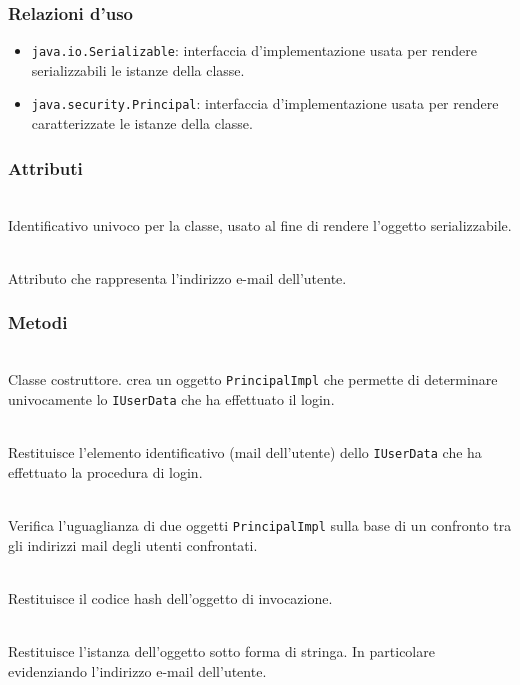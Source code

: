\subsubsection*{Relazioni d'uso}
\begin{itemize}
	\item \texttt{java.io.Serializable}: interfaccia d'implementazione usata per rendere serializzabili le istanze della classe.
	\item \texttt{java.security.Principal}: interfaccia d'implementazione usata per rendere caratterizzate le istanze della classe.
\end{itemize}

\subsubsection*{Attributi}
\begin{description}
  \item{}\\
  Identificativo univoco per la classe, usato al fine di rendere l'oggetto serializzabile.
  \item{}\\
  Attributo che rappresenta l'indirizzo e-mail dell'utente.
\end{description}

\subsubsection*{Metodi}
\begin{description}
	\item{}\\
	Classe costruttore. crea un oggetto \texttt{PrincipalImpl} che permette di determinare univocamente lo \texttt{IUserData} che ha effettuato il login.
	\item{}\\
	Restituisce l'elemento identificativo (mail dell'utente) dello \texttt{IUserData} che ha effettuato la procedura di login.
	\item{}\\
	Verifica l'uguaglianza di due oggetti \texttt{PrincipalImpl} sulla base di un confronto tra gli indirizzi mail degli utenti confrontati.
	\item{}\\
	Restituisce il codice hash dell'oggetto di invocazione.				\item{}\\
	Restituisce l'istanza dell'oggetto sotto forma di stringa. In particolare evidenziando l'indirizzo e-mail dell'utente.
\end{description}


